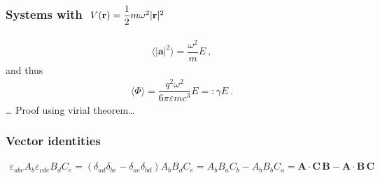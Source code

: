 \documentclass[letterpaper,10pt,english]{jupyterBook}
\begin{document}
\subsubsection*{Systems with \protect\(\ V(\mathbf{r}) = \dfrac{1}{2} m \omega^2 |\mathbf{r}|^2\protect\)}
\begin{equation*}
\begin{split}\langle | \mathbf{a} |^2 \rangle = \dfrac{\omega^2}{m} E \ ,\end{split}
\end{equation*}
\sphinxAtStartPar
and thus
\begin{equation}\label{equation:ch/quantum-mechanics/history/larmor-formula:eq:larmor:quadratic:power-energy}
\begin{split}\langle \Phi \rangle = \dfrac{q^2 \omega^2}{6 \pi \varepsilon m c^3} E =: \gamma E \ .\end{split}
\end{equation}
\sphinxAtStartPar
… Proof using virial theorem…
\subsubsection*{Vector identities}
\begin{equation*}
\begin{split}\varepsilon_{abc} A_b \varepsilon_{cde} B_d C_e = ( \delta_{ad} \delta_{be} - \delta_{ae} \delta_{bd} ) A_b B_d C_e = A_b B_a C_b - A_b B_b C_a = \mathbf{A} \cdot \mathbf{C} \, \mathbf{B} - \mathbf{A} \cdot \mathbf{B} \, \mathbf{C}\end{split}
\end{equation*}
\sphinxstepscope
\end{document}
